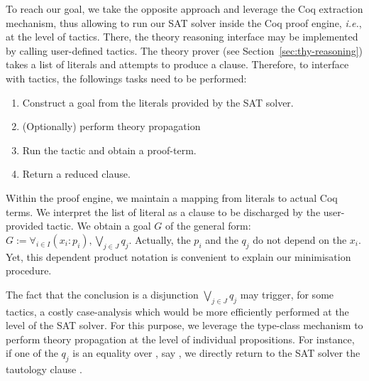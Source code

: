 \documentclass[utf8,a4paper,UKenglish,cleveref, autoref, thm-restate]{lipics-v2021}
\begin{document}
To reach our goal, we take the opposite approach and leverage the Coq
extraction mechanism, thus allowing to run our SAT solver inside the
Coq proof engine, \emph{i.e.}, at the level of tactics.
%
There, the theory reasoning interface may be implemented by calling
user-defined tactics.
%
The theory prover  (see Section~\ref{sec:thy-reasoning})
takes a list of literals and attempts to produce a clause.
Therefore, to interface with tactics, the followings tasks need to be performed:
\begin{enumerate}
\item Construct a goal from the literals provided by the SAT solver.
\item (Optionally) perform theory propagation
\item Run the tactic and obtain a proof-term.
\item Return a reduced clause.
\end{enumerate}
Within the proof engine, we maintain a mapping from literals to actual
Coq terms. We interpret the list of literal as a clause to be
discharged by the user-provided tactic. We obtain a goal $G$ of the general form:
$
  G {:=} \forall_{i\in I} (x_i:p_i), \bigvee_{j\in J} q_j
$.
Actually, the $p_i$ and the $q_j$ do not depend on the
$x_i$. Yet, this dependent product notation is convenient to
explain our minimisation procedure.

The fact that the conclusion is a disjunction $\bigvee_{j\in J} q_j$
may trigger, for some tactics, a costly case-analysis which would be
more efficiently performed at the level of the SAT solver. For this
purpose, we leverage the type-class mechanism to perform theory
propagation at the level of individual propositions. For instance, if one of
the $q_j$ is an equality over , say , we 
directly return to the SAT solver the tautology clause
.
\end{document}
